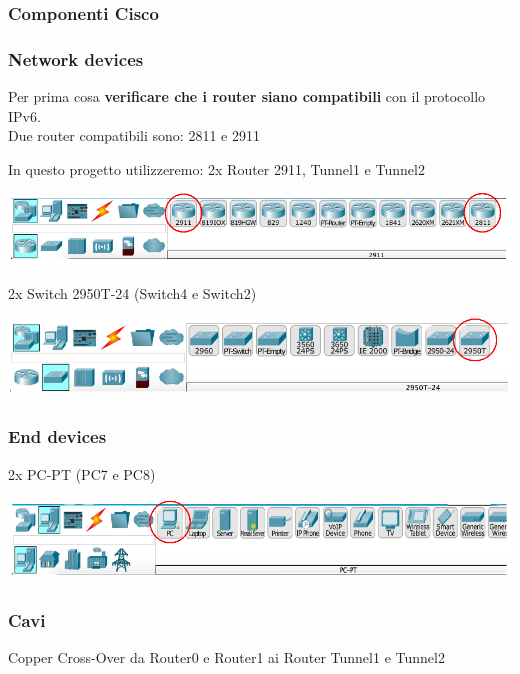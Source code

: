 \subsubsection{Componenti Cisco}

\subsubsection*{Network devices}
Per prima cosa \textbf{verificare che i router siano compatibili} con il protocollo IPv6.\\
Due router compatibili sono: 2811 e 2911

In questo progetto utilizzeremo: 2x Router 2911, Tunnel1 e Tunnel2

\begin{center}
    \includegraphics[width=\linewidth]{images/07.routing-sicurezza/tunneling/01.routers.png}
\end{center}

2x Switch 2950T-24 (Switch4 e Switch2)

\begin{center}
    \includegraphics[width=\linewidth]{images/07.routing-sicurezza/tunneling/02.png}
\end{center}

\subsubsection*{End devices}
2x PC-PT (PC7 e PC8)

\begin{center}
    \includegraphics[width=\linewidth]{images/07.routing-sicurezza/tunneling/03.png}
\end{center}

\subsubsection*{Cavi}
Copper Cross-Over da Router0 e Router1 ai Router Tunnel1 e Tunnel2

